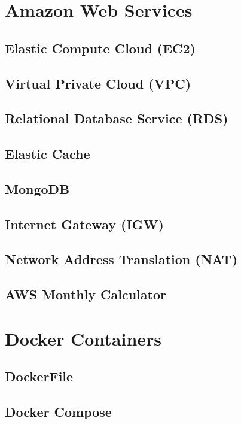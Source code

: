 
\section{Amazon Web Services}
\subsection{Elastic Compute Cloud (EC2)}
\subsection{Virtual Private Cloud (VPC)}
\subsection{Relational Database Service (RDS)}
\subsection{Elastic Cache}
\subsection{MongoDB}
\subsection{Internet Gateway (IGW)}
\subsection{Network Address Translation (NAT)}
\subsection{AWS Monthly Calculator}

\pagebreak
\section{Docker Containers}
\subsection{DockerFile}
\subsection{Docker Compose}